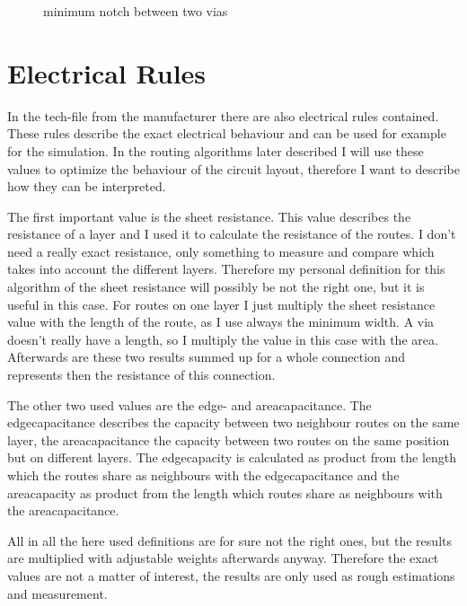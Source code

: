 \begin{figure}
	\centering
	
	\caption{minimum notch between two vias}
	\label{fig:technology_rule_notch}
\end{figure}

\section{Electrical Rules}
In the tech-file from the manufacturer there are also electrical rules contained. These rules describe the exact electrical behaviour and can be used for example for the simulation. In the routing algorithms later described I will use these values to optimize the behaviour of the circuit layout, therefore I want to describe how they can be interpreted.

The first important value is the sheet resistance. This value describes the resistance of a layer and I used it to calculate the resistance of the routes. I don't need a really exact resistance, only something to measure and compare which takes into account the different layers. Therefore my personal definition for this algorithm of the sheet resistance will possibly be not the right one, but it is useful in this case. For routes on one layer I just multiply the sheet resistance value with the length of the route, as I use always the minimum width. A via doesn't really have a length, so I multiply the value in this case with the area. Afterwards are these two results summed up for a whole connection and represents then the resistance of this connection.

The other two used values are the edge- and areacapacitance. The edgecapacitance describes the capacity between two neighbour routes on the same layer, the areacapacitance the capacity between two routes on the same position but on different layers. The edgecapacity is calculated as product from the length which the routes share as neighbours with the edgecapacitance and the areacapacity as product from the length which routes share as neighbours with the areacapacitance.

All in all the here used definitions are for sure not the right ones, but the results are multiplied with adjustable weights afterwards anyway. Therefore the exact values are not a matter of interest, the results are only used as rough estimations and measurement.






